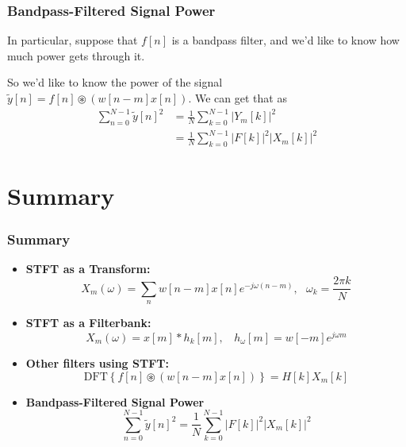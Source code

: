 \documentclass{beamer}
\begin{document}
\begin{frame}
  \frametitle{Bandpass-Filtered Signal Power}

  In particular, suppose that $f[n]$ is a bandpass filter, and we'd
  like to know how much power gets through it.

  So we'd like to know the power of the signal
  $\tilde{y}[n]=f[n]\circledast (w[n-m]x[n])$.  We can get that as
  \begin{align*}
    \sum_{n=0}^{N-1} \tilde{y}[n]^2 
    &= \frac{1}{N}\sum_{k=0}^{N-1} |Y_m[k]|^2\\
    &= \frac{1}{N}\sum_{k=0}^{N-1} |F[k]|^2 |X_m[k]|^2
  \end{align*}
\end{frame}

\section[Summary]{Summary}
\setcounter{subsection}{1}

\begin{frame}
  \frametitle{Summary}
  \begin{itemize}
  \item {\bf STFT as a Transform:}
    \[
    X_m(\omega)= \sum_n w[n-m]x[n]e^{-j\omega (n-m)},~~~\omega_k=\frac{2\pi k}{N}
    \]
  \item {\bf STFT as a Filterbank:}
    \[
    X_m(\omega) = x[m] \ast h_k[m],~~~~h_\omega[m] = w[-m]e^{j\omega m}
    \]
  \item {\bf Other filters using STFT:}
    \[
    \mbox{DFT}\left\{f[n] \circledast (w[n-m]x[n])\right\} = H[k]X_m[k]
    \]
  \item {\bf Bandpass-Filtered Signal Power}
    \[
    \sum_{n=0}^{N-1} \tilde{y}[n]^2 
    = \frac{1}{N}\sum_{k=0}^{N-1} |F[k]|^2 |X_m[k]|^2
    \]
  \end{itemize}
\end{frame}  
\end{document}
